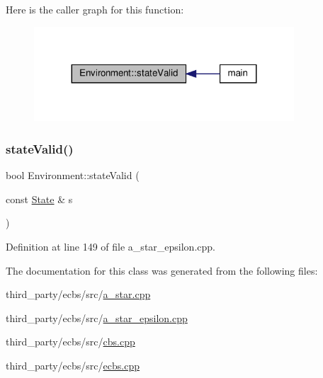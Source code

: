 Here is the caller graph for this function\+:
\nopagebreak
\begin{figure}[H]
\begin{center}
\leavevmode
\includegraphics[width=275pt]{class_environment_ad21a790ab0279b0f5b445e1f460dc971_icgraph}
\end{center}
\end{figure}
\mbox{\label{class_environment_ad21a790ab0279b0f5b445e1f460dc971}} 
\subsubsection{\texorpdfstring{state\+Valid()}{stateValid()}\hspace{0.1cm}{\footnotesize\ttfamily [2/2]}}
{\footnotesize\ttfamily bool Environment\+::state\+Valid (\begin{DoxyParamCaption}\item[{const \hyperlink{struct_state}{State} \&}]{s }\end{DoxyParamCaption})\hspace{0.3cm}{\ttfamily [inline]}}



Definition at line 149 of file a\+\_\+star\+\_\+epsilon.\+cpp.



The documentation for this class was generated from the following files\+:\begin{DoxyCompactItemize}
\item 
third\+\_\+party/ecbs/src/\hyperlink{a__star_8cpp}{a\+\_\+star.\+cpp}\item 
third\+\_\+party/ecbs/src/\hyperlink{a__star__epsilon_8cpp}{a\+\_\+star\+\_\+epsilon.\+cpp}\item 
third\+\_\+party/ecbs/src/\hyperlink{cbs_8cpp}{cbs.\+cpp}\item 
third\+\_\+party/ecbs/src/\hyperlink{ecbs_8cpp}{ecbs.\+cpp}\end{DoxyCompactItemize}
